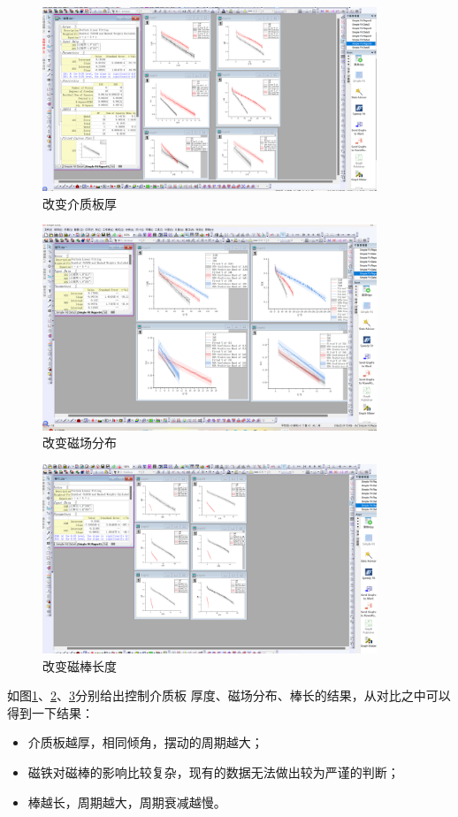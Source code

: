 \documentclass[AutoFakeBold]{LZUThesis}
\begin{document}
\begin{figure}[H]
    \centering
    \includegraphics[width=10cm]{figures/板厚.png}
    \caption{改变介质板厚}
    \label{改变介质板厚}
\end{figure}

\begin{figure}[H]
    \centering
    \includegraphics[width=10cm]{figures/磁场分布.png}
    \caption{改变磁场分布}
    \label{改变磁场分布}
\end{figure}

\begin{figure}[H]
    \centering
    \includegraphics[width=10cm]{figures/棒长.png}
    \caption{改变磁棒长度}
    \label{改变磁棒长度}
\end{figure}
如图\ref{改变介质板厚}、\ref{改变磁场分布}、\ref{改变磁棒长度}分别给出控制介质板
厚度、磁场分布、棒长的结果，从对比之中可以得到一下结果：
\begin{itemize}
    \item 介质板越厚，相同倾角，摆动的周期越大；
    \item 磁铁对磁棒的影响比较复杂，现有的数据无法做出较为严谨的判断；
    \item 棒越长，周期越大，周期衰减越慢。
\end{itemize}
\end{document}
